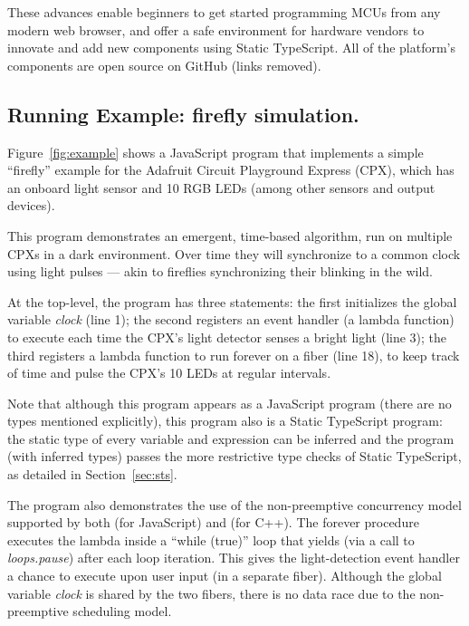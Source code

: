 These advances enable beginners to get started programming MCUs from any modern web browser, and offer a safe environment for hardware vendors to innovate and add new components using Static TypeScript. All of the platform's components are open source on GitHub (links removed).

\subsection{Running Example: firefly simulation.}

Figure~\ref{fig:example} shows a JavaScript
program that implements a simple ``firefly'' example
for the Adafruit Circuit Playground Express (CPX), which has an onboard light sensor and 10 RGB LEDs (among other sensors and output devices).

This program demonstrates an emergent, time-based algorithm, run on multiple CPXs in a dark environment. Over time they will synchronize to a common clock using light pulses --- akin to fireflies synchronizing their blinking in the wild.


At the top-level, the program has three statements:
the first initializes the global variable \emph{clock} (line 1); the
second registers an event handler (a lambda function) to execute
each time the CPX's light detector senses a bright light (line 3); the
third registers a lambda function to run forever on a fiber (line 18),
to keep track of time and pulse the CPX's 10 LEDs at regular intervals.

Note that although this program appears as a JavaScript program (there are no
types mentioned explicitly), this program also is a Static TypeScript program:
the static type of every variable and expression
can be inferred and the program (with inferred types) passes the more restrictive type checks
of Static TypeScript, as detailed in Section~\ref{sec:sts}.

The program also demonstrates the use of the non-preemptive concurrency
model supported by both \MC (for JavaScript) and \CO (for C++).
The forever procedure executes the lambda inside a ``while (true)''
loop that yields (via a call to \emph{loops.pause}) after each loop iteration.
This gives the light-detection event handler a chance to execute
upon user input (in a separate fiber). Although the global variable \emph{clock} is
shared by the two fibers, there is no data race due to the non-preemptive
scheduling model.

